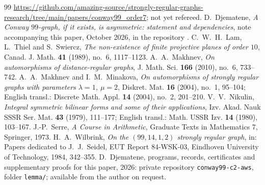 \documentclass[11pt]{amsart}
\theoremstyle{definition}
\theoremstyle{remark}
\begin{document}
\begin{thebibliography}{99}
\url{https://github.com/amazing-source/strongly-regular-graphs-research/tree/main/papers/conway99_order7}; not yet refereed.
 D.~Djematene, \emph{A Conway $99$-graph, if it exists, is asymmetric: statement and dependencies}, note accompanying this
paper, October 2026, in the repository \cite{repo}.
 C.~W.~H.~Lam, L.~Thiel and S.~Swiercz, \emph{The non-existence of finite projective planes of order $10$},
Canad. J. Math. \textbf{41} (1989), no.~6, 1117--1123.
 A.~A.~Makhnev, \emph{On automorphisms of distance-regular graphs}, J. Math. Sci. \textbf{166} (2010),
no.~6, 733--742.
 A.~A.~Makhnev and I.~M.~Minakova, \emph{On automorphisms of strongly regular graphs with parameters
$\lambda=1$, $\mu=2$}, Diskret. Mat. \textbf{16} (2004), no.~1, 95--104; English transl.: Discrete Math. Appl. \textbf{14}
(2004), no.~2, 201--210.
 V.~V.~Nikulin, \emph{Integral symmetric bilinear forms and some of their applications}, Izv. Akad. Nauk
SSSR Ser. Mat. \textbf{43} (1979), 111--177; English transl.: Math. USSR Izv. \textbf{14} (1980), 103--167.
 J.-P.~Serre, \emph{A Course in Arithmetic}, Graduate Texts in Mathematics 7, Springer, 1973.
 H.~A.~Wilbrink, \emph{On the $(99,14,1,2)$ strongly regular graph}, in: Papers dedicated to J.~J.~Seidel,
EUT Report 84-WSK-03, Eindhoven University of Technology, 1984, 342--355.
 D.~Djematene, programs, records, certificates and supplementary proofs for this paper, 2026:
private repository \texttt{conway99-c2-aws}, folder \texttt{lemma/}; available from the author on request.
\end{thebibliography}
\end{document}

